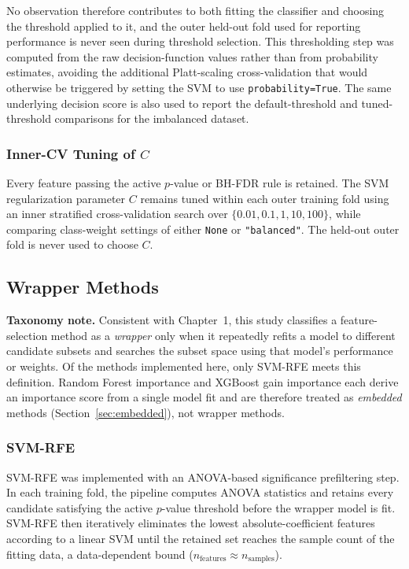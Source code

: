 No observation therefore contributes to both fitting the classifier and choosing the threshold applied to it, and the outer held-out fold used for reporting performance is never seen during threshold selection. This thresholding step was computed from the raw decision-function values rather than from probability estimates, avoiding the additional Platt-scaling cross-validation that would otherwise be triggered by setting the SVM to use \texttt{probability=True}. The same underlying decision score is also used to report the default-threshold and tuned-threshold comparisons for the imbalanced dataset.

\subsubsection{Inner-CV Tuning of $C$}

Every feature passing the active $p$-value or BH-FDR rule is retained. The SVM regularization parameter $C$ remains tuned within each outer training fold using an inner stratified cross-validation search over $\{0.01, 0.1, 1, 10, 100\}$, while comparing class-weight settings of either \texttt{None} or \texttt{"balanced"}. The held-out outer fold is never used to choose $C$.

\subsection{Wrapper Methods}

\textbf{Taxonomy note.} Consistent with Chapter~1, this study classifies a feature-selection method as a \emph{wrapper} only when it repeatedly refits a model to different candidate subsets and searches the subset space using that model's performance or weights. Of the methods implemented here, only SVM-RFE meets this definition. Random Forest importance and XGBoost gain importance each derive an importance score from a single model fit and are therefore treated as \emph{embedded} methods (Section~\ref{sec:embedded}), not wrapper methods.

\subsubsection{SVM-RFE}

SVM-RFE was implemented with an ANOVA-based significance prefiltering step. In each training fold, the pipeline computes ANOVA statistics and retains every candidate satisfying the active $p$-value threshold before the wrapper model is fit. SVM-RFE then iteratively eliminates the lowest absolute-coefficient features according to a linear SVM until the retained set reaches the sample count of the fitting data, a data-dependent bound ($n_{\mathrm{features}} \approx n_{\mathrm{samples}}$).


